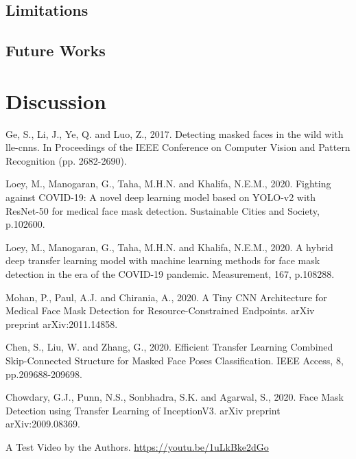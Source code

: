 \documentclass{svproc}
\begin{document}
\subsection{Limitations}
\subsection{Future Works}
\section{Discussion}

%
%
\begin{thebibliography}{6}
%
Ge, S., Li, J., Ye, Q. and Luo, Z., 2017. Detecting masked faces in the wild with lle-cnns. In Proceedings of the IEEE Conference on Computer Vision and Pattern Recognition (pp. 2682-2690).

Loey, M., Manogaran, G., Taha, M.H.N. and Khalifa, N.E.M., 2020. Fighting against COVID-19: A novel deep learning model based on YOLO-v2 with ResNet-50 for medical face mask detection. Sustainable Cities and Society, p.102600.

Loey, M., Manogaran, G., Taha, M.H.N. and Khalifa, N.E.M., 2020. A hybrid deep transfer learning model with machine learning methods for face mask detection in the era of the COVID-19 pandemic. Measurement, 167, p.108288.

Mohan, P., Paul, A.J. and Chirania, A., 2020. A Tiny CNN Architecture for Medical Face Mask Detection for Resource-Constrained Endpoints. arXiv preprint arXiv:2011.14858.

Chen, S., Liu, W. and Zhang, G., 2020. Efficient Transfer Learning Combined Skip-Connected Structure for Masked Face Poses Classification. IEEE Access, 8, pp.209688-209698.

Chowdary, G.J., Punn, N.S., Sonbhadra, S.K. and Agarwal, S., 2020. Face Mask Detection using Transfer Learning of InceptionV3. arXiv preprint arXiv:2009.08369.

A Test Video by the Authors. \url{https://youtu.be/1uLkBke2dGo}

\end{thebibliography}
\end{document}
